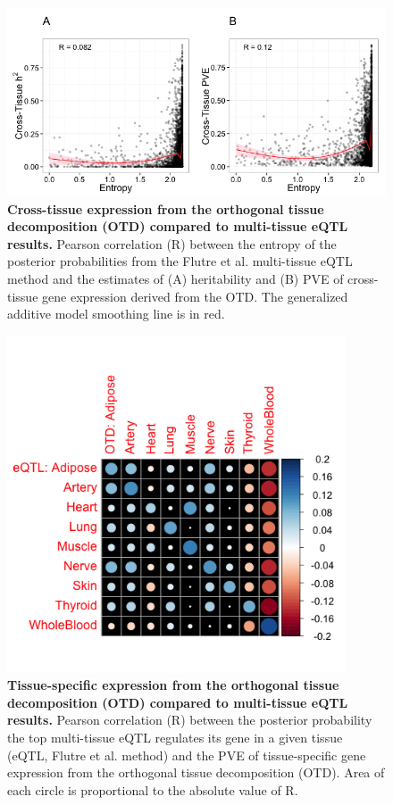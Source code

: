 \documentclass[10pt,letterpaper]{article}
\begin{document}
\begin{figure}[h]
\includegraphics[width=12cm]{Figures/Fig-CT-entropy.png}
\caption{{\bf Cross-tissue expression from the 
orthogonal tissue decomposition (OTD) compared to multi-tissue eQTL results.} 
Pearson correlation (R) between the entropy of the posterior probabilities
from the Flutre et al. multi-tissue eQTL method 
and the estimates of (A) heritability and (B) PVE of cross-tissue
gene expression derived from the OTD. The generalized additive model smoothing 
line is in red.}
\label{fig-ct-entropy}
\end{figure}

\begin{figure}[h]
\includegraphics[width=10cm]{Figures/Fig-cor-StephensPr-OTDtsPVE.png}
\caption{{\bf Tissue-specific expression from the 
orthogonal tissue decomposition (OTD) compared to multi-tissue eQTL results.} 
Pearson correlation (R) between the 
posterior probability the top multi-tissue eQTL regulates its gene in a given tissue (eQTL, 
Flutre et al. method) and the PVE of tissue-specific gene expression from the orthogonal
tissue decomposition (OTD). Area of each circle is proportional to the absolute value of R.}
\label{fig-corrplot}
\end{figure}
\end{document}
